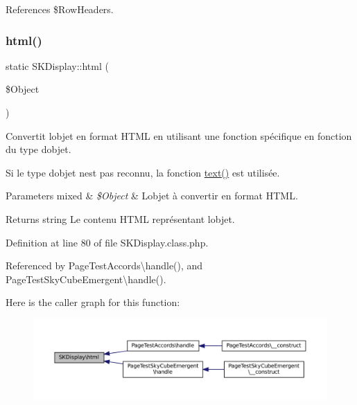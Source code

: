 References \$\+Row\+Headers.

\mbox{\label{class_s_k_display_af34871f9eb4bf1b47200f631babade40}} 
\subsubsection{\texorpdfstring{html()}{html()}}
{\footnotesize\ttfamily static S\+K\+Display\+::html (\begin{DoxyParamCaption}\item[{}]{\$\+Object }\end{DoxyParamCaption})\hspace{0.3cm}{\ttfamily [static]}}

Convertit l\textquotesingle{}objet en format H\+T\+ML en utilisant une fonction spécifique en fonction du type d\textquotesingle{}objet.

Si le type d\textquotesingle{}objet n\textquotesingle{}est pas reconnu, la fonction \hyperlink{class_s_k_display_a890c2827ea7d0ce8f9ec3e8cc56e9ccf}{text()} est utilisée. 
\begin{DoxyParams}[1]{Parameters}
mixed & {\em \$\+Object} & L\textquotesingle{}objet à convertir en format H\+T\+ML. \\
\hline
\end{DoxyParams}
\begin{DoxyReturn}{Returns}
string Le contenu H\+T\+ML représentant l\textquotesingle{}objet. 
\end{DoxyReturn}


Definition at line 80 of file S\+K\+Display.\+class.\+php.



Referenced by Page\+Test\+Accords\textbackslash{}handle(), and Page\+Test\+Sky\+Cube\+Emergent\textbackslash{}handle().

Here is the caller graph for this function\+:\nopagebreak
\begin{figure}[H]
\begin{center}
\leavevmode
\includegraphics[width=350pt]{class_s_k_display_af34871f9eb4bf1b47200f631babade40_icgraph}
\end{center}
\end{figure}
\mbox{\label{class_s_k_display_a300475659a3435d38f6dc5c5ee8b5643}} 
